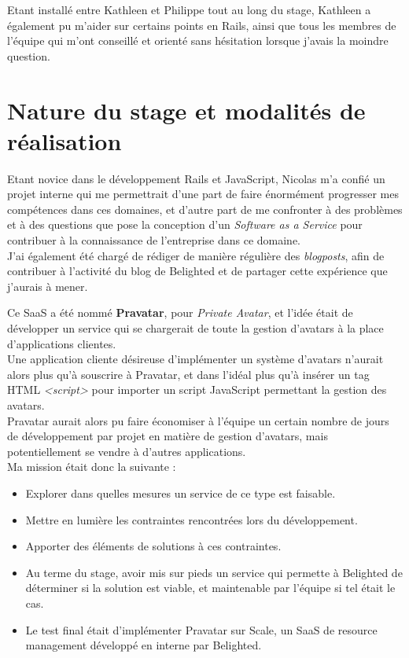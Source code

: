 \documentclass{report}
\begin{document}
  Etant installé entre Kathleen et Philippe tout au long du stage, Kathleen a également pu m'aider sur certains points en Rails, ainsi que tous les membres de l'équipe qui m'ont conseillé et orienté sans
  hésitation lorsque j'avais la moindre question.\\


\chapter{Nature du stage et modalités de réalisation}

  Etant novice dans le développement Rails et JavaScript, Nicolas m'a confié un projet interne qui me permettrait d'une part de faire énormément progresser mes compétences dans ces domaines, et
  d'autre part de me confronter à des problèmes et à des questions que pose la conception d'un \textit{Software as a Service} pour contribuer à la connaissance de l'entreprise dans ce domaine.\\
  J'ai également été chargé de rédiger de manière régulière des \textit{blogposts}, afin de contribuer à l'activité du blog de Belighted et de partager cette expérience que j'aurais à mener.

  Ce SaaS a été nommé \textbf{Pravatar}, pour \textit{Private Avatar}, et l'idée était de développer un service qui se chargerait de toute la gestion d'avatars à la place d'applications clientes.\\
  Une application cliente désireuse d'implémenter un système d'avatars n'aurait alors plus qu'à souscrire à Pravatar, et dans l'idéal plus qu'à insérer un tag HTML \textit{<script>} pour importer un script
  JavaScript permettant la gestion des avatars.\\
  Pravatar aurait alors pu faire économiser à l'équipe un certain nombre de jours de développement par projet en matière de gestion d'avatars, mais potentiellement se vendre à d'autres applications.\\

  Ma mission était donc la suivante : \\

  \begin{itemize}
    \item Explorer dans quelles mesures un service de ce type est faisable.
    \item Mettre en lumière les contraintes rencontrées lors du développement.
    \item Apporter des éléments de solutions à ces contraintes.
    \item Au terme du stage, avoir mis sur pieds un service qui permette à Belighted de déterminer si la solution est viable, et maintenable par l'équipe si tel était le cas.
    \item Le test final était d'implémenter Pravatar sur Scale, un SaaS de resource management développé en interne par Belighted.\\
  \end{itemize}
\end{document}
